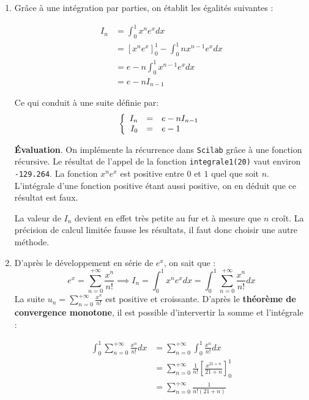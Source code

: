 \documentclass[a4paper,11pt]{article}
\theoremstyle{nonumberplain}
\theoremstyle{nonumberplain}
\theoremstyle{nonumberplain}
\begin{document}
    \begin{enumerate}
        \setlength\itemsep{2em}
        \item
        Grâce à une intégration par parties, on établit les égalités suivantes :

        \begin{equation*}
        \begin{split}
            I_{n}   & = \int_{0}^{1} x^{n}e^{x} dx \\
                    & = [x^{n}e^{x}]_{0}^{1} - \int_{0}^{1} n x^{n-1}e^{x} dx \\
                    & = e - n\int_{0}^{1} x^{n-1}e^{x} dx \\
                    & = e - n I_{n-1}
        \end{split}
        \end{equation*}

        Ce qui conduit à une suite définie par:
        \[
        \left\{
        \begin{array}{r c l}
            I_{n} &=& e - n I_{n-1}\\
            I_{0} &=& e - 1
        \end{array}
        \right.
        \]

        \textbf{\'{E}valuation}. On implémente la récurrence dans \texttt{Scilab} grâce à une fonction récursive.
        Le résultat de l'appel de la fonction \texttt{integrale1(20)} vaut environ \texttt{-129.264}.
        La fonction $x^{n}e^{x}$ est positive entre $0$ et $1$ quel que soit $n$.
        L'intégrale d'une fonction positive étant aussi positive, on en déduit que ce résultat est faux.

        La valeur de $I_{n}$ devient en effet très petite au fur et à mesure que $n$ croît.
        La précision de calcul limitée fausse les résultats, il faut donc choisir une autre méthode.

        \item
        D'après le développement en série de $e^{x}$, on sait que :
        $$e^{x} =  \sum\limits_{n = 0}^{+\infty} \frac{x^{n}}{n!} \implies I_{n} = \int_{0}^{1} x^{n}e^{x} dx = \int_{0}^{1}\sum\limits_{n = 0}^{+\infty} \frac{x^{n}}{n!} dx$$
        La suite $u_{n} = \sum\limits_{n = 0}^{+\infty} \frac{x^{n}}{n!}$ est positive et croissante. D'après le \textbf{théorème
        de convergence monotone}, il est possible d'intervertir la somme et l'intégrale :

        \begin{equation*}
        \begin{split}
            \int_{0}^{1}\sum\limits_{n = 0}^{+\infty} \frac{x^{n}}{n!} dx   & = \sum\limits_{n = 0}^{+\infty}\int_{0}^{1}\frac{x^{n}}{n!} dx \\
                                                                            & = \sum\limits_{n = 0}^{+\infty} \frac{1}{n!}\left[\frac{x^{21 + n}}{21 + n}\right]_{0}^{1} \\
                                                                            & = \sum\limits_{n = 0}^{+\infty} \frac{1}{n! (21+n)}
        \end{split}
        \end{equation*}


\end{enumerate}
\end{document}
